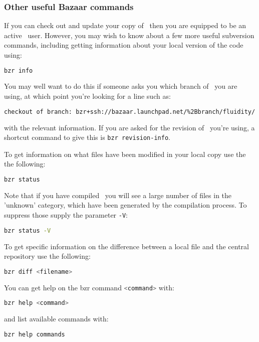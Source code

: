 \subsubsection{Other useful Bazaar commands}
\label{sec:subversion_extras}

If you can check out and update your copy of \fluidity\ then you are equipped to
be an active \fluidity\ user. However, you may wish to know about a few more
useful subversion commands, including getting information about your local
version of the code using:

\begin{lstlisting}[language=Bash]
bzr info
\end{lstlisting}

You may well want to do this if someone asks you which branch of \fluidity\ you
are using, at which point you're looking for a line such as:

\begin{lstlisting}[language=Bash]
checkout of branch: bzr+ssh://bazaar.launchpad.net/%2Bbranch/fluidity/
\end{lstlisting}

with the relevant information. If you are asked for the revision of
\fluidity\ you're using, a shortcut command to give this is
\lstinline[language=Bash]+bzr revision-info+.

To get information on what files have been modified in your
local copy use the the following:
\begin{lstlisting}[language=Bash]
bzr status
\end{lstlisting}

Note that if you have compiled \fluidity\ you will see a large number of files
in the 'unknown' category, which have been generated by the compilation
process. To suppress those supply the parameter \lstinline[language=Bash]+-V+:
\begin{lstlisting}[language=Bash]
bzr status -V
\end{lstlisting}

To get specific information on the difference between a local file and
the central repository use the following:
\begin{lstlisting}[language=Bash]
bzr diff <filename>
\end{lstlisting}

You can get help on the bzr command \lstinline[language=Bash]+<command>+
with:
\begin{lstlisting}[language=Bash]
bzr help <command>
\end{lstlisting}
and list available commands with:
\begin{lstlisting}[language=Bash]
bzr help commands
\end{lstlisting}

